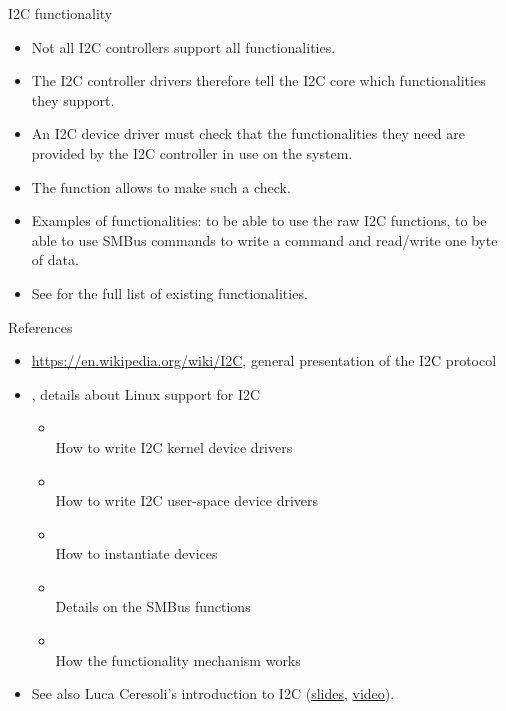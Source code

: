 \begin{frame}{I2C functionality}
  \begin{itemize}
  \item Not all I2C controllers support all functionalities.
  \item The I2C controller drivers therefore tell the I2C core which
    functionalities they support.
  \item An I2C device driver must check that the functionalities they
    need are provided by the I2C controller in use on the system.
  \item The  function allows to make
    such a check.
  \item Examples of functionalities:  to be able to
    use the raw I2C functions,  to be
    able to use SMBus commands to write a command and read/write one
    byte of data.
  \item See  for the full list of
    existing functionalities.
  \end{itemize}
\end{frame}

\begin{frame}{References}
  \begin{itemize}
  \item \url{https://en.wikipedia.org/wiki/I2C}, general presentation
    of the I2C protocol
  \item {}, details about Linux support for I2C
    \begin{itemize}
    \item {}\\
      How to write I2C kernel device drivers
    \item {}\\
      How to write I2C user-space device drivers
    \item {}\\
      How to instantiate devices
    \item {}\\
      Details on the SMBus functions
    \item {}\\
      How the functionality mechanism works
    \end{itemize}
  \item
    See also Luca Ceresoli's introduction to I2C
    (\href{https://bootlin.com/pub/conferences/2022/elce/ceresoli-basics-of-i2c-on-linux/ceresoli-basics-of-i2c-on-linux.pdf}{slides},
    \href{https://www.youtube.com/watch?v=g9-wgdesvwA}{video}).
  \end{itemize}
\end{frame}

